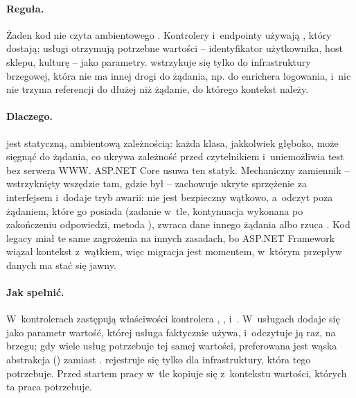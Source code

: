 \paragraph{Reguła.} Żaden kod nie czyta ambientowego .
Kontrolery i~endpointy używają , który dostają; usługi otrzymują
potrzebne wartości -- identyfikator użytkownika, host sklepu, kulturę -- jako parametry.
 wstrzykuje się tylko do infrastruktury brzegowej, która nie
ma innej drogi do żądania, np. do enrichera logowania, i~nic nie trzyma referencji do
 dłużej niż żądanie, do którego kontekst należy.

\paragraph{Dlaczego.}  jest statyczną, ambientową
zależnością: każda klasa, jakkolwiek głęboko, może sięgnąć do żądania, co ukrywa zależność
przed czytelnikiem i~uniemożliwia test bez serwera WWW. ASP.NET Core usuwa ten statyk.
Mechaniczny zamiennik --  wstrzyknięty wszędzie tam, gdzie
był  -- zachowuje ukryte sprzężenie za interfejsem i~dodaje
tryb awarii:  nie jest bezpieczny wątkowo, a~odczyt poza żądaniem,
które go posiada (zadanie w~tle, kontynuacja wykonana po zakończeniu odpowiedzi, metoda
), zwraca dane innego żądania albo rzuca
. Kod legacy miał te same zagrożenia na innych zasadach,
bo ASP.NET Framework wiązał kontekst z~wątkiem, więc migracja jest momentem, w~którym
przepływ danych ma stać się jawny.

\paragraph{Jak spełnić.} W~kontrolerach  zastępują
właściwości kontrolera , , 
i~. W~usługach dodaje się jako parametr wartość, której usługa faktycznie
używa, i~odczytuje ją raz, na brzegu; gdy wiele usług potrzebuje tej samej wartości,
preferowana jest wąska abstrakcja () zamiast
.  rejestruje się tylko dla
infrastruktury, która tego potrzebuje. Przed startem pracy w~tle kopiuje się z~kontekstu
wartości, których ta praca potrzebuje.

